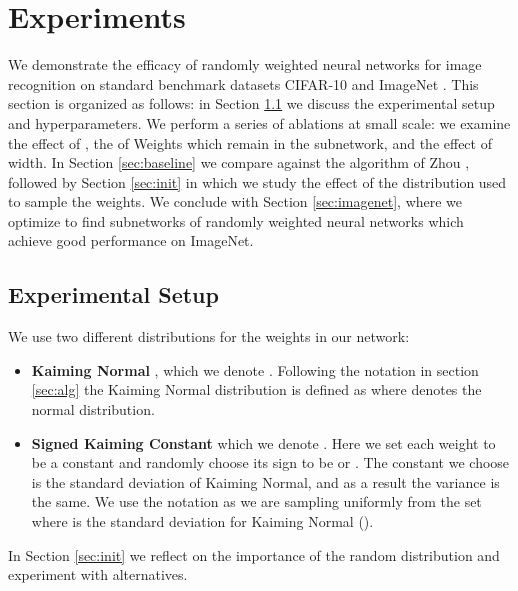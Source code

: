 \documentclass[10pt,twocolumn,letterpaper]{article}
\begin{document}
\section{Experiments}\label{sec:exp}

We demonstrate the efficacy of randomly weighted neural networks for image recognition on standard benchmark datasets CIFAR-10 \cite{cifar} and ImageNet \cite{imagenet}. This section is organized as follows: in Section \ref{sec:setup} we discuss the experimental setup and hyperparameters. We perform a series of ablations at small scale: we examine the effect of , the  of Weights which remain in the subnetwork, and the effect of width. In Section \ref{sec:baseline} we compare against the algorithm of Zhou \etal, followed by Section \ref{sec:init} in which we study the effect of the distribution used to sample the weights. We conclude with Section \ref{sec:imagenet}, where we optimize to find subnetworks of randomly weighted neural networks which achieve good performance on ImageNet.

\subsection{Experimental Setup} \label{sec:setup}

We use two different distributions for the weights in our network:
\begin{itemize}
    \item \textbf{Kaiming Normal} \cite{kaiming-init}, which we denote . Following the notation in section \ref{sec:alg}  the Kaiming Normal distribution is defined as  where  denotes the normal distribution.
    \item \textbf{Signed Kaiming Constant} which we denote . Here we set each weight to be a constant and randomly choose its sign to be  or . The constant we choose is the standard deviation of Kaiming Normal, and as a result the variance is the same. We use the notation  as we are sampling uniformly from the set  where  is the standard deviation for Kaiming Normal (\ie ).
\end{itemize}
In Section \ref{sec:init} we reflect on the importance of the random distribution and experiment with alternatives.
\end{document}
